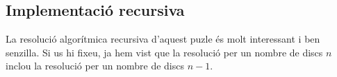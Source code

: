 \subsection{Implementació recursiva}
La resolució algorítmica recursiva d'aquest puzle és molt interessant i ben senzilla.
Si us hi fixeu, ja hem vist que la resolució per un nombre de discs $n$ inclou la resolució per un nombre de discs $n-1$.

